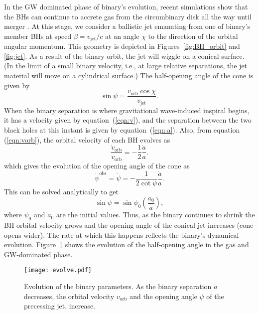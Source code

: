 \documentclass[a4paper,fleqn,usenatbib]{mnras}
\begin{document}
In the GW dominated phase of binary's evolution, recent simulations
show that the BHs can continue to accrete gas from the circumbinary
disk all the way until merger \citep{2015MNRAS.446L..36F}.  At this
stage, we consider a ballistic jet emanating from one of binary's
member BHs at speed $\beta=v_\mathrm{jet}/c$ at an angle $\chi$ to the
direction of the orbital angular momentum.  This geometry is depicted
in Figures~\ref{fig:BH_orbit} and \ref{fig:jet}.  As a result of the
binary orbit, the jet will wiggle on a conical surface.  (In the limit
of a small binary velocity, i.e., at large relative separations, the
jet material will move on a cylindrical surface.)  The half-opening
angle of the cone is given by \citep{1993ApJ...409..130R}
\begin{equation}
  \sin\psi = \frac{v_\mathrm{orb}\cos\chi}{v_\mathrm{jet}}.
\end{equation}
When the binary separation is where gravitational wave-induced
inspiral begins, it has a velocity given by equation~(\ref{eqn:v}),
and the separation between the two black holes at this instant is
given by equation~(\ref{eqn:a}).  Also, from equation
(\ref{eqn:vorb}), the orbital velocity of each BH evolves as
\begin{equation}
  \frac{\dot v_\mathrm{orb}}{v_\mathrm{orb}} = -\frac{1}{2}\frac{\dot a}{a}.
\end{equation}
which gives the evolution of the opening angle of the cone as 
\begin{equation}
  \dot\psi^\mathrm{obs}=\dot\psi = -\frac{1}{2\cot\psi}\frac{\dot a}{a}.
\end{equation}
This can be solved analytically to get
\begin{equation}
  \sin\psi = \sin\psi_0\left(\frac{a_0}{a}\right),
\end{equation}
where $\psi_0$ and $a_0$ are the initial values. Thus, as the binary
continues to shrink the BH orbital velocity grows and the opening
angle of the conical jet increases (cone opens wider).  The rate at
which this happens reflects the binary's dynamical evolution.
Figure~\ref{fig:evolve} shows the evolution of the half-opening angle
in the gas and GW-dominated phase.

\begin{figure}
  \begin{center}
    \texttt{[image: evolve.pdf]}
  \end{center}
  \caption{Evolution of the binary parameters.  As the binary
    separation $a$ decreases, the orbital velocity $v_\mathrm{orb}$
    and the opening angle $\psi$ of the precessing jet, increase.}
  \label{fig:evolve}
\end{figure}
\end{document}
